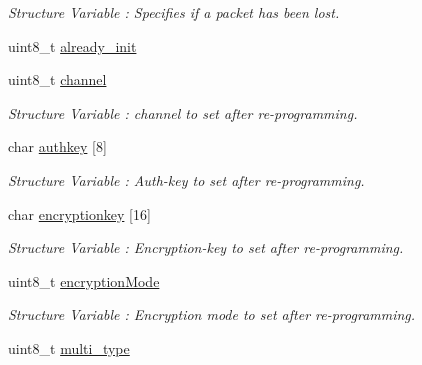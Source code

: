 \begin{DoxyCompactItemize}
\begin{DoxyCompactList}\small\item\em Structure Variable \+: Specifies if a packet has been lost. \end{DoxyCompactList}\item 
uint8\+\_\+t \hyperlink{structfirmware__struct_aef6c8d3ca515b79cc90cd19771728cdc}{already\+\_\+init}
\item 
uint8\+\_\+t \hyperlink{structfirmware__struct_a8ec3a6fa6df29858181dbaad52c11282}{channel}\hypertarget{structfirmware__struct_a8ec3a6fa6df29858181dbaad52c11282}{}\label{structfirmware__struct_a8ec3a6fa6df29858181dbaad52c11282}

\begin{DoxyCompactList}\small\item\em Structure Variable \+: channel to set after re-\/programming. \end{DoxyCompactList}\item 
char \hyperlink{structfirmware__struct_a19f4018fdc00dbf11176ca7ba2c8bee3}{authkey} \mbox{[}8\mbox{]}\hypertarget{structfirmware__struct_a19f4018fdc00dbf11176ca7ba2c8bee3}{}\label{structfirmware__struct_a19f4018fdc00dbf11176ca7ba2c8bee3}

\begin{DoxyCompactList}\small\item\em Structure Variable \+: Auth-\/key to set after re-\/programming. \end{DoxyCompactList}\item 
char \hyperlink{structfirmware__struct_ac32416b7ef38ef9a54457ea635ed53f7}{encryptionkey} \mbox{[}16\mbox{]}\hypertarget{structfirmware__struct_ac32416b7ef38ef9a54457ea635ed53f7}{}\label{structfirmware__struct_ac32416b7ef38ef9a54457ea635ed53f7}

\begin{DoxyCompactList}\small\item\em Structure Variable \+: Encryption-\/key to set after re-\/programming. \end{DoxyCompactList}\item 
uint8\+\_\+t \hyperlink{structfirmware__struct_aaaafc667d37b8a52f7b59b28f0d19f56}{encryption\+Mode}\hypertarget{structfirmware__struct_aaaafc667d37b8a52f7b59b28f0d19f56}{}\label{structfirmware__struct_aaaafc667d37b8a52f7b59b28f0d19f56}

\begin{DoxyCompactList}\small\item\em Structure Variable \+: Encryption mode to set after re-\/programming. \end{DoxyCompactList}\item 
uint8\+\_\+t \hyperlink{structfirmware__struct_aa6c65e36d85aad5b0b8bb459b7924005}{multi\+\_\+type}
\end{DoxyCompactItemize}


